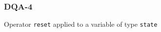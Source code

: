 \subsubsection{DQA-4}\label{sec:error_code_dqa_4}

Operator \texttt{reset} applied to a variable of type \texttt{state}


